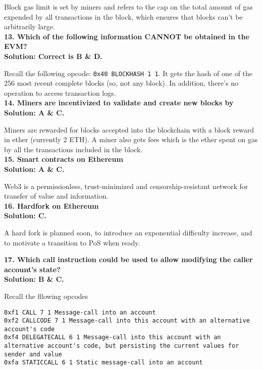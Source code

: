 Block gas limit is set by miners and refers to the cap on the total amount of gas expended by all transactions in the block, which ensures that blocks can't be arbitrarily large.\\

\textbf{13. Which of the following information CANNOT be obtained in the EVM?}\label{sec:exam1_q13}\\

\textbf{Solution: Correct is B \& D.}

Recall the following opcode: \verb|0x40 BLOCKHASH 1 1|.
It gets the hash of one of the 256 most recent complete blocks (so, not any block).
In addition, there's no operation to access transaction logs.\\

\textbf{14. Miners are incentivized to validate and create new blocks by}\label{sec:exam1_q14}\\

\textbf{Solution: A \& C.}

Miners are rewarded for blocks accepted into the blockchain with a block reward in ether (currently 2 ETH).
A miner also gets fees which is the ether spent on gas by all the transactions included in the block.\\

\textbf{15. Smart contracts on Ethereum}\label{sec:exam1_q15}\\

\textbf{Solution: A \& C.}

Web3 is a permissionless, trust-minimized and censorship-resistant network for transfer of value and information.\\

\textbf{16. Hardfork on Ethereum}\label{sec:exam1_q16}\\

\textbf{Solution: C.}

A hard fork is planned soon, to introduce an exponential difficulty increase, and to motivate a transition to PoS when ready.\\

\pagebreak

\textbf{17. Which call instruction could be used to allow modifying the caller account’s state?}\label{sec:exam1_q17}\\

\textbf{Solution: B \& C.}

Recall the fllowing opcodes
\begin{lstlisting}[style=defaultStyle]
0xf1 CALL 7 1 Message-call into an account
0xf2 CALLCODE 7 1 Message-call into this account with an alternative account's code
0xf4 DELEGATECALL 6 1 Message-call into this account with an alternative account's code, but persisting the current values for sender and value
0xfa STATICCALL 6 1 Static message-call into an account
\end{lstlisting}

